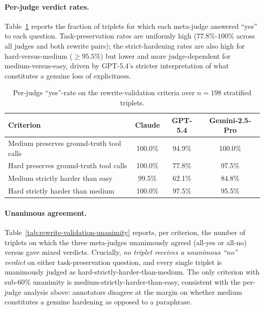 \paragraph{Per-judge verdict rates.}
Table~\ref{tab:rewrite-validation-per-judge} reports the fraction of triplets for which each meta-judge answered ``yes'' to each question. Task-preservation rates are uniformly high ($77.8\%$-$100\%$ across all judges and both rewrite pairs); the strict-hardening rates are also high for hard-versus-medium ($\geq 95.5\%$) but lower and more judge-dependent for medium-versus-easy, driven by GPT-5.4's stricter interpretation of what constitutes a genuine loss of explicitness.

\begin{table}[!htbp]
\centering
\small
\setlength{\tabcolsep}{6pt}
\renewcommand{\arraystretch}{1.1}
\caption{Per-judge ``yes''-rate on the rewrite-validation criteria over $n = 198$ stratified triplets.}
\label{tab:rewrite-validation-per-judge}
\begin{tabular}{@{}lccc@{}}
\toprule
\textbf{Criterion} & \textbf{Claude} & \textbf{GPT-5.4} & \textbf{Gemini-2.5-Pro} \\
\midrule
Medium preserves ground-truth tool calls        & 100.0\% & 94.9\% & 100.0\% \\
Hard preserves ground-truth tool calls          & 100.0\% & 77.8\% & 97.5\% \\
Medium strictly harder than easy                & 99.5\%  & 62.1\% & 84.8\%  \\
Hard strictly harder than medium                & 100.0\% & 97.5\% & 95.5\%  \\
\bottomrule
\end{tabular}
\end{table}

\paragraph{Unanimous agreement.}
Table~\ref{tab:rewrite-validation-unanimity} reports, per criterion, the number of triplets on which the three meta-judges unanimously agreed (all-yes or all-no) versus gave mixed verdicts. Crucially, \emph{no triplet receives a unanimous ``no'' verdict} on either task-preservation question, and every single triplet is unanimously judged as hard-strictly-harder-than-medium. The only criterion with sub-$60\%$ unanimity is medium-strictly-harder-than-easy, consistent with the per-judge analysis above: annotators disagree at the margin on whether medium constitutes a genuine hardening as opposed to a paraphrase.

